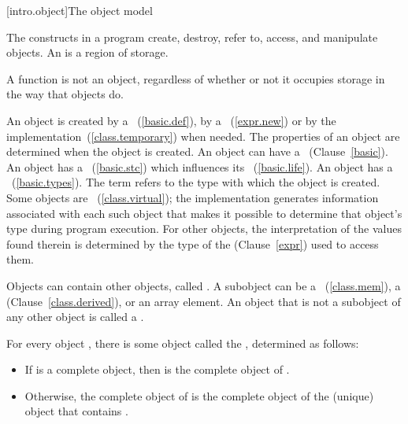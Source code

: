 [intro.object]{The \Cpp object model}

\pnum
{}%
%
The constructs in a \Cpp program create, destroy, refer to, access, and
manipulate objects. An  is a region of storage.
\begin{note} A function is not an object, regardless of whether or not it
occupies storage in the way that objects do. \end{note} An object is
created by a ~(\ref{basic.def}), by a
~(\ref{expr.new}) or by the
implementation~(\ref{class.temporary}) when needed. The properties of an
object are determined when the object is created. An object can have a
~(Clause~\ref{basic}). An object has a ~(\ref{basic.stc}) which influences its
~(\ref{basic.life}). An object has a
~(\ref{basic.types}). The term  refers to
the type with which the object is created.
Some objects are
~(\ref{class.virtual}); the implementation
generates information associated with each such object that makes it
possible to determine that object's type during program execution. For
other objects, the interpretation of the values found therein is
determined by the type of the  (Clause~\ref{expr})
used to access them.

\pnum
{}%
Objects can contain other objects, called .
A subobject can be
a ~(\ref{class.mem}), a 
(Clause~\ref{class.derived}), or an array element.
%
An object that is not a subobject of any other object is called a .

\pnum
For every object , there is some object called the
 , determined as follows:

\begin{itemize}

\item
If  is a complete object, then  is the complete
object of .

\item
Otherwise, the complete object of  is the complete object
of the (unique) object that contains .

\end{itemize}

